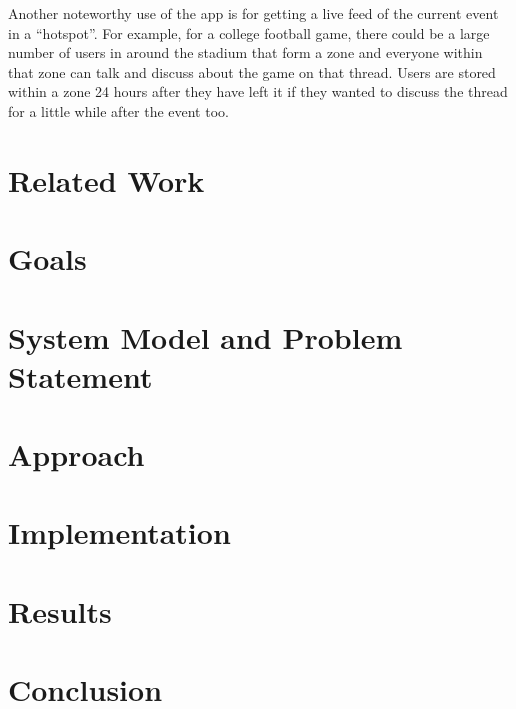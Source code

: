 \documentclass[11pt, journal]{IEEEtran}
\begin{document}
		Another noteworthy use of the app is for getting a live feed of the current event in a ``hotspot''. For example, for a college football game, there could be a large number of users in around the stadium that form a zone and everyone within that zone can talk and discuss about the game on that thread. Users are stored within a zone 24 hours after they have left it if they wanted to discuss the thread for a little while after the event too.

\section{Related Work}


\section{Goals}

\section{System Model and Problem Statement}


\section{Approach}


\section{Implementation}


\section{Results}


\section{Conclusion}

\end{document}
